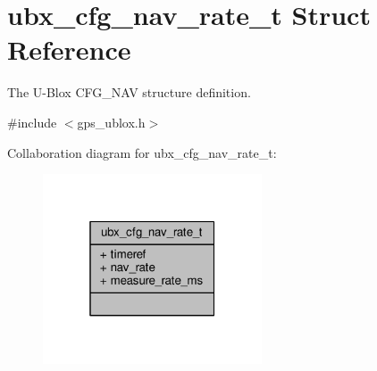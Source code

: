 \hypertarget{structubx__cfg__nav__rate__t}{\section{ubx\+\_\+cfg\+\_\+nav\+\_\+rate\+\_\+t Struct Reference}
\label{structubx__cfg__nav__rate__t}
}


The U-\/\+Blox C\+F\+G\+\_\+\+N\+A\+V structure definition.  




{\ttfamily \#include $<$gps\+\_\+ublox.\+h$>$}



Collaboration diagram for ubx\+\_\+cfg\+\_\+nav\+\_\+rate\+\_\+t\+:
\nopagebreak
\begin{figure}[H]
\begin{center}
\leavevmode
\includegraphics[width=184pt]{structubx__cfg__nav__rate__t__coll__graph}
\end{center}
\end{figure}
